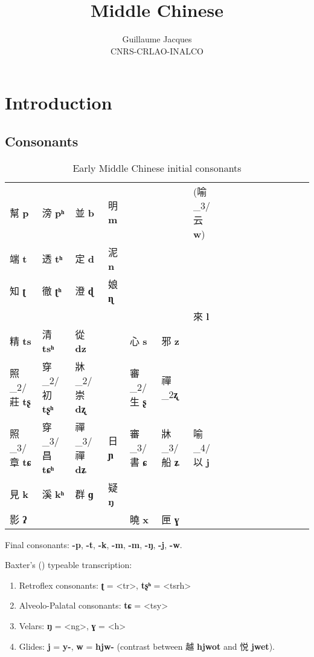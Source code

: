 \documentclass[oneside,a4paper,11pt]{article}
\newcommand{\ipa}[1]{{\phon\textbf{#1}}}
\newcommand{\zh}[1]{{\cn #1}}
\newcommand{\zhc}[2]{\zh{#1} \ipa{#2}}
\begin{document}
 
\title{Middle Chinese}
\author{Guillaume Jacques\\ CNRS-CRLAO-INALCO}
\maketitle

\section{Introduction}

\subsection{Consonants}
\begin{table}[H]
\caption{Early Middle Chinese initial consonants} \label{tab:mc.onset}
\begin{tabular}{llllllllllllllll}
\toprule
 	\zhc{幫}{p} & 	\zhc{滂}{pʰ} & 	\zhc{並}{b} & 	\zhc{明}{m} & 	 & 	 & (\zh{喻}_3/\zhc{云}{w})	 & 	\\
  	\zhc{端}{t} & 	\zhc{透}{tʰ} & 	\zhc{定}{d} & 	\zhc{泥}{n} & 	 & 	 & 	 & 	\\
 	\zhc{知}{ʈ} & 	\zhc{徹}{ʈʰ} & 	\zhc{澄}{ɖ} & 	\zhc{娘}{ɳ} & 	 & 	 & 	 & 	\\
  	 & 	 & 	 & 	 & 	 & 	 & 	\zhc{來}{l} & 	\\
  	\zhc{精}{ts} & 	\zhc{清}{tsʰ} & 	\zhc{從}{dz} & 	 & 	\zhc{心}{s} & 	\zhc{邪}{z} & 	 & 	\\
  	\zh{照}_2/\zhc{莊}{tʂ} & 	\zh{穿}_2/\zhc{初}{tʂʰ} & 	\zh{牀}_2/\zhc{崇}{dʐ} & 	 & 	  	\zh{審}_2/\zhc{生}{ʂ} & 	 \zh{禪}_2\ipa{ʐ} & 	 & 	\\
 	  	\zh{照}_3/\zhc{章}{tɕ} & 	\zh{穿}_3/\zhc{昌}{tɕʰ} & 	\zh{禪}_3/\zhc{禪}{dʑ} & 	\zhc{日}{ɲ} & 	\zh{審}_3/\zhc{書}{ɕ} & 	\zh{牀}_3/\zhc{船}{ʑ} & 	\zh{喻}_4/\zhc{以}{j} & 	\\
 	\zhc{見}{k} & 	\zhc{溪}{kʰ} & 	\zhc{群}{ɡ} & 	\zhc{疑}{ŋ} & 	 & 	 & 	 & 	\\
 	\zhc{影}{ʔ} & 	 & 	 & 	 & 	\zhc{曉}{x} & 	\zhc{匣}{ɣ} & 	 & 	\\
\bottomrule
\end{tabular}
\end{table}

Final consonants: \ipa{-p},  \ipa{-t},  \ipa{-k},  \ipa{-m},  \ipa{-m},  \ipa{-ŋ}, \ipa{-j}, \ipa{-w}.

Baxter's (\citeyear{baxter92}) typeable transcription: 
\begin{enumerate}
\item Retroflex consonants: \ipa{ʈ} = <tr>, \ipa{tʂʰ}  = <tsrh>
\item Alveolo-Palatal consonants: \ipa{tɕ} = <tsy>
\item Velars: \ipa{ŋ} = <ng>, \ipa{ɣ} = <h>
\item Glides: \ipa{j} = \ipa{y-}, \ipa{w} = \ipa{hjw-} (contrast between \zhc{越}{hjwot}  and \zhc{悦}{jwet}).
\end{enumerate}
\end{document}

